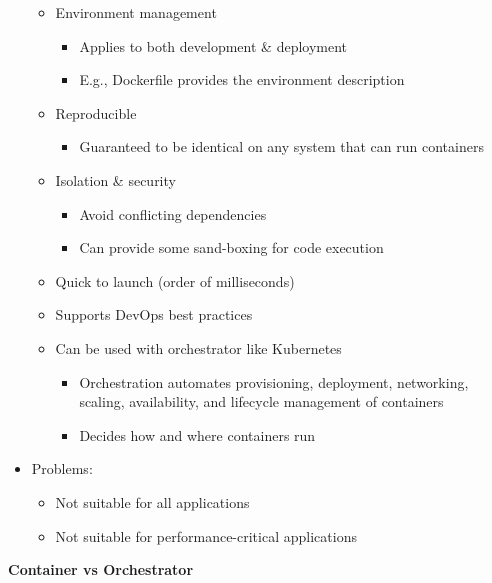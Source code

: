 \documentclass[landscape,a4paper]{extarticle}
\begin{document}
\begin{multicols*}{5}
\begin{itemize}
\begin{itemize}
\begin{itemize}
            \end{itemize}
            \item Environment management
            \begin{itemize}
                \item Applies to both development \& deployment
                \item E.g., Dockerfile provides the environment description
            \end{itemize}
            \item Reproducible
            \begin{itemize}
                \item Guaranteed to be identical on any system that can run containers
            \end{itemize}
            \item Isolation \& security
            \begin{itemize}
                \item Avoid conflicting dependencies
                \item Can provide some sand-boxing for code execution
            \end{itemize}
            \item Quick to launch (order of milliseconds)
            \item Supports DevOps best practices
            \item Can be used with orchestrator like Kubernetes
            \begin{itemize}
                \item Orchestration automates provisioning, deployment, networking, scaling, availability, and lifecycle management of containers
                \item Decides how and where containers run
            \end{itemize}
    \end{itemize}

    \item Problems:
        \begin{itemize}
            \item Not suitable for all applications
            \item Not suitable for performance-critical applications
        \end{itemize}
    \end{itemize}

    \textbf{Container vs Orchestrator}


\end{multicols*}
\end{document}

